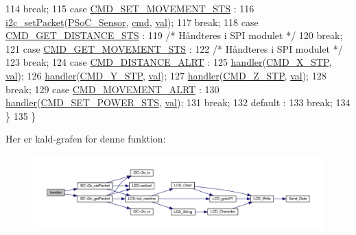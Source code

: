 \begin{DoxyCode}
114       \textcolor{keywordflow}{break};
115     \textcolor{keywordflow}{case} \hyperlink{handler_8h_a84f8a23b131cb2b163e16889afd9ef85}{CMD\_SET\_MOVEMENT\_STS} :
116       \hyperlink{i2c_8h_a0e13c9c7d87ebdb3680495a787f68d29}{i2c\_setPacket}(\hyperlink{i2c_8h_adc44ca05813864518773ea6f3543816c}{PSoC\_Sensor}, \hyperlink{queue_8h_a85092d82ab6ea85dad51ba78cbda36a0}{cmd}, \hyperlink{queue_8h_aa0ccb5ee6d882ee3605ff47745c6467b}{val});
117       \textcolor{keywordflow}{break};
118     \textcolor{keywordflow}{case} \hyperlink{handler_8h_a8ea17eed84662f9389bfa1751c03a4b2}{CMD\_GET\_DISTANCE\_STS} :
119       \textcolor{comment}{/* Håndteres i SPI modulet */}
120       \textcolor{keywordflow}{break};
121     \textcolor{keywordflow}{case} \hyperlink{handler_8h_a4adcfb68de1b319e19342143cb61b550}{CMD\_GET\_MOVEMENT\_STS} :
122       \textcolor{comment}{/* Håndteres i SPI modulet */}
123       \textcolor{keywordflow}{break};
124     \textcolor{keywordflow}{case} \hyperlink{handler_8h_a17dc606d3dbd6f9d4ca831cb02c91af0}{CMD\_DISTANCE\_ALRT} :
125       \hyperlink{class_handler_af5be5b016b862943cd22504490acc8f4}{handler}(\hyperlink{handler_8h_af7c8f19d1c1b9e2240251d42109c5cfd}{CMD\_X\_STP}, \hyperlink{queue_8h_aa0ccb5ee6d882ee3605ff47745c6467b}{val});
126       \hyperlink{class_handler_af5be5b016b862943cd22504490acc8f4}{handler}(\hyperlink{handler_8h_a83ab3037b2c91ea010b2d8c47acd5434}{CMD\_Y\_STP}, \hyperlink{queue_8h_aa0ccb5ee6d882ee3605ff47745c6467b}{val});
127       \hyperlink{class_handler_af5be5b016b862943cd22504490acc8f4}{handler}(\hyperlink{handler_8h_ad119aef78e8cb8e9aa12f35aeae94a99}{CMD\_Z\_STP}, \hyperlink{queue_8h_aa0ccb5ee6d882ee3605ff47745c6467b}{val});
128       \textcolor{keywordflow}{break};
129     \textcolor{keywordflow}{case} \hyperlink{handler_8h_a7bd43223cfa796f0289d0548e090bbcc}{CMD\_MOVEMENT\_ALRT} :
130       \hyperlink{class_handler_af5be5b016b862943cd22504490acc8f4}{handler}(\hyperlink{handler_8h_a1fe6f15c7c98032dc2bd2a1417977fcf}{CMD\_SET\_POWER\_STS}, \hyperlink{queue_8h_aa0ccb5ee6d882ee3605ff47745c6467b}{val});
131       \textcolor{keywordflow}{break};
132     \textcolor{keywordflow}{default} :
133       \textcolor{keywordflow}{break};
134   \}
135 \}
\end{DoxyCode}


Her er kald-\/grafen for denne funktion\+:
\nopagebreak
\begin{figure}[H]
\begin{center}
\leavevmode
\includegraphics[width=350pt]{d2/d01/class_handler_af5be5b016b862943cd22504490acc8f4_cgraph}
\end{center}
\end{figure}




